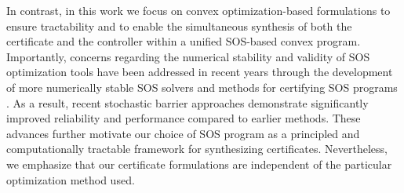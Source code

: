 \documentclass[journal,twoside,web]{ieeecolor}
\newcommand{\ml}[1]{{\color{blue}[ML: #1]}}
\theoremstyle{definition}
\theoremstyle{plain}
\theoremstyle{plain}
\begin{document}


In contrast, in this work we focus on convex optimization-based formulations to ensure tractability and to enable the simultaneous synthesis of both the certificate and the controller within a unified SOS-based convex program. Importantly, concerns regarding the numerical stability and validity of SOS optimization tools have been addressed in recent years through the development of more numerically stable SOS solvers \cite{legat2017sos, mazouz2026stochasticbarrier} and methods for certifying SOS programs \cite{wajid2025successive, panja2025correct}. As a result, recent stochastic barrier approaches \cite{mazouz2026stochasticbarrier} demonstrate significantly improved reliability and performance compared to earlier methods. These advances further motivate our choice of SOS program as a principled and computationally tractable framework for synthesizing certificates. Nevertheless, we emphasize that our certificate formulations are independent of the particular optimization method used.
\end{document}
